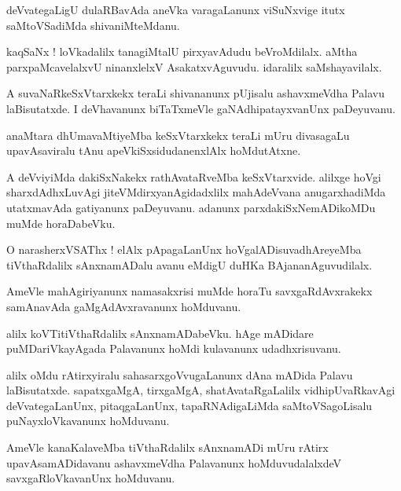 \documentclass{article}
\begin{document}
\begin{mn}
deVvategaLigU dulaRBavAda aneVka varagaLanunx viSuNxvige itutx saMtoVSadiMda shivaniMteMdanu.
\end{mn}

\begin{mn}
kaqSaNx ! loVkadalilx tanagiMtalU pirxyavAdudu beVroMdilalx. aMtha parxpaMcavelalxvU ninanxlelxV 
AsakatxvAguvudu. idaralilx saMshayavilalx.
\end{mn}

\begin{mn}
A suvaNaRkeSxVtarxkekx teraLi shivananunx pUjisalu ashavxmeVdha Palavu laBisutatxde. I 
deVhavanunx biTaTxmeVle gaNAdhipatayxvanUnx paDeyuvanu.
\end{mn}

\begin{mn}
anaMtara dhUmavaMtiyeMba keSxVtarxkekx teraLi mUru divasagaLu upavAsaviralu tAnu 
apeVkiSxsidudanenxlAlx hoMdutAtxne.
\end{mn}

\begin{mn}
A deVviyiMda dakiSxNakekx rathAvataRveMba keSxVtarxvide. alilxge hoVgi sharxdAdhxLuvAgi 
jiteVMdirxyanAgidadxlilx mahAdeVvana anugarxhadiMda utatxmavAda gatiyanunx paDeyuvanu.
adanunx parxdakiSxNemADikoMDu muMde horaDabeVku.
\end{mn}

\begin{mn}
O narasherxVSAThx ! elAlx pApagaLanUnx hoVgalADisuvadhAreyeMba tiVthaRdalilx sAnxnamADalu avanu 
eMdigU duHKa BAjananAguvudilalx.
\end{mn}

\begin{mn}
AmeVle mahAgiriyanunx namasakxrisi muMde horaTu savxgaRdAvxrakekx samAnavAda gaMgAdAvxravanunx 
hoMduvanu.
\end{mn}

\begin{mn}
alilx koVTitiVthaRdalilx sAnxnamADabeVku. hAge mADidare puMDariVkayAgada Palavanunx hoMdi 
kulavanunx udadhxrisuvanu.
\end{mn}

\begin{mn}
alilx oMdu rAtirxyiralu sahasarxgoVvugaLanunx dAna mADida Palavu laBisutatxde. sapatxgaMgA, 
tirxgaMgA, shatAvataRgaLalilx vidhipUvaRkavAgi deVvategaLanUnx, pitaqgaLanUnx, tapaRNAdigaLiMda 
saMtoVSagoLisalu puNayxloVkavanunx hoMduvanu.
\end{mn}

\begin{mn}
AmeVle kanaKalaveMba tiVthaRdalilx sAnxnamADi mUru rAtirx upavAsamADidavanu ashavxmeVdha Palavanunx 
hoMduvudalalxdeV savxgaRloVkavanUnx hoMduvanu.
\end{mn}
\end{document}
